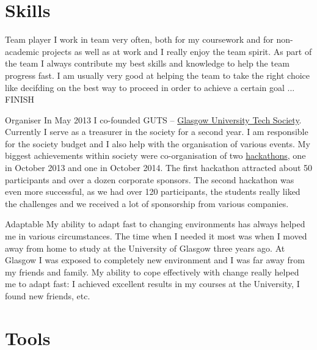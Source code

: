 \documentclass{tccv}
\begin{document}
\section{\LARGE Skills \normalsize}

\begin{skillist}
\item{Team player} {I work in team very often, both for my coursework and for non-academic projects as well as at work and I really enjoy the team spirit. As part of the team I always contribute my best skills and knowledge to help the team progress fast. I am usually very good at helping the team to take the right choice like decifding on the best way to proceed in order to achieve a certain goal ... FINISH} %

\item{Organiser} {In May 2013 I co-founded GUTS -- \href{http://gutechsoc.com}{Glasgow University Tech Society}. Currently I serve as a treasurer in the society for a second year. I am responsible for the society budget and I also help with the organisation of various events. My biggest achievements within society were co-organisation of two \href{http://storify.com/Eventhread/gu-hackaton}{hackathons}, one in October 2013 and one in October 2014. The first hackathon attracted about 50 participants and over a dozen corporate sponsors. The second hackathon was even more successful, as we had over 120 participants, the students really liked the challenges and we received a lot of sponsorship from various companies.}

\item{Adaptable} {My ability to adapt fast to changing environments has always helped me in various circumstances. The time when I needed it most was when I moved away from home to study at the University of Glasgow three years ago. At Glasgow I was exposed to completely new environment and I was far away from my friends and family. My ability to cope effectively with change really helped me to adapt fast: I achieved excellent results in my courses at the University, I found new friends, etc.}

\end{skillist}
\newpage
\section{\LARGE Tools \normalsize}
\end{document}
